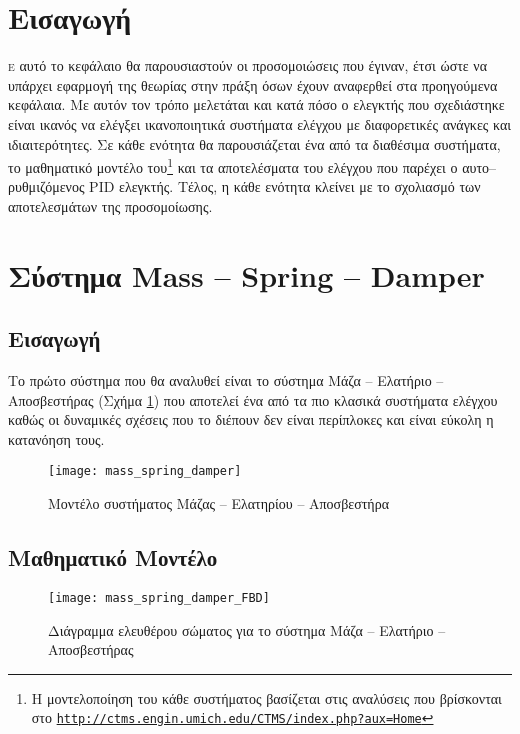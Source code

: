 


\section{Εισαγωγή}

\lettrine[findent=2pt]{}{ε} αυτό το κεφάλαιο θα παρουσιαστούν οι προσομοιώσεις που έγιναν, έτσι ώστε να υπάρχει εφαρμογή της θεωρίας στην πράξη όσων έχουν αναφερθεί στα προηγούμενα κεφάλαια. Με αυτόν τον τρόπο μελετάται και κατά πόσο ο ελεγκτής που σχεδιάστηκε είναι ικανός να ελέγξει ικανοποιητικά συστήματα ελέγχου με διαφορετικές ανάγκες και ιδιαιτερότητες. Σε κάθε ενότητα θα παρουσιάζεται ένα από τα διαθέσιμα συστήματα, το μαθηματικό μοντέλο του\footnote{Η μοντελοποίηση του κάθε συστήματος βασίζεται στις αναλύσεις που βρίσκονται στο \texttt{\url{http://ctms.engin.umich.edu/CTMS/index.php?aux=Home}}} και τα αποτελέσματα του ελέγχου που παρέχει ο αυτο--ρυθμιζόμενος PID ελεγκτής. Τέλος, η κάθε ενότητα κλείνει με το σχολιασμό των αποτελεσμάτων της προσομοίωσης.

\section{Σύστημα Mass -- Spring -- Damper} \label{sec:mass_spring_damper}

\subsection{Εισαγωγή}

Το πρώτο σύστημα που θα αναλυθεί είναι το σύστημα Μάζα -- Ελατήριο -- Αποσβεστήρας (Σχήμα \ref{fig:mass_spring_damper}) που αποτελεί ένα από τα πιο κλασικά συστήματα ελέγχου καθώς οι δυναμικές σχέσεις που το διέπουν δεν είναι περίπλοκες και είναι εύκολη η κατανόηση τους.

\begin{figure}[h]
  \centering
  \texttt{[image: mass\_spring\_damper]}
  \caption{Μοντέλο συστήματος Μάζας -- Ελατηρίου -- Αποσβεστήρα}
  \label{fig:mass_spring_damper}
\end{figure}

\subsection{Μαθηματικό Μοντέλο}

\begin{figure}[h]
  \centering
  \texttt{[image: mass\_spring\_damper\_FBD]}
  \caption{Διάγραμμα ελευθέρου σώματος για το σύστημα Μάζα -- Ελατήριο -- Αποσβεστήρας}
  \label{fig:mass_spring_damper_FBD}
\end{figure}


